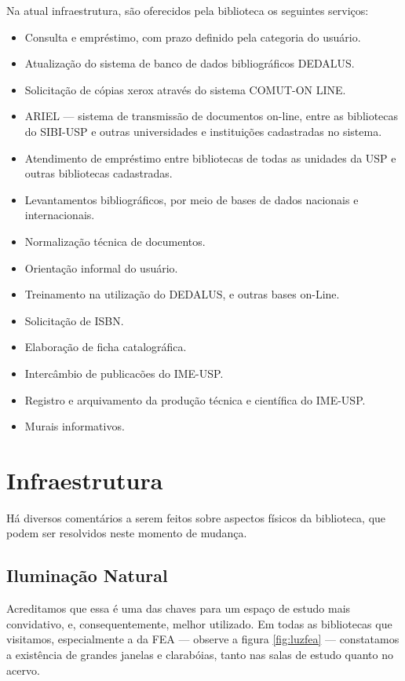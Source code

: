 \documentclass[titlepage]{article}
\begin{document}
Na atual infraestrutura, são oferecidos pela biblioteca os seguintes serviços:
\begin{itemize}
\item Consulta e empréstimo, com prazo definido pela categoria do usuário.
\item Atualização do sistema de banco de dados bibliográficos DEDALUS.
\item Solicitação de cópias xerox através do sistema COMUT-ON LINE.
\item ARIEL --- sistema de transmissão de documentos on-line, entre as 
bibliotecas do SIBI-USP e outras universidades e instituições cadastradas 
no sistema.
\item Atendimento de empréstimo entre bibliotecas de todas as unidades da USP e
outras bibliotecas cadastradas.
\item Levantamentos bibliográficos, por meio de bases de dados nacionais e
internacionais.
\item Normalização técnica de documentos.
\item Orientação informal do usuário.
\item Treinamento na utilização do DEDALUS, e outras bases on-Line.
\item Solicitação de ISBN.
\item Elaboração de ficha catalográfica.
\item Intercâmbio de publicacões do IME-USP.
\item Registro e arquivamento da produção técnica e científica do IME-USP.
\item Murais informativos.
\end{itemize}

\clearpage
\section{Infraestrutura}

Há diversos comentários a serem feitos sobre aspectos físicos da biblioteca, que
podem ser resolvidos neste momento de mudança. 

\subsection{Iluminação Natural}
Acreditamos que essa é uma das chaves para um espaço de estudo mais convidativo,
e, consequentemente, melhor utilizado. Em todas as bibliotecas que visitamos, 
especialmente a da FEA --- observe a figura \ref{fig:luzfea} --- constatamos
a existência de grandes janelas e clarabóias, tanto nas salas de estudo quanto
no acervo. 
\end{document}

